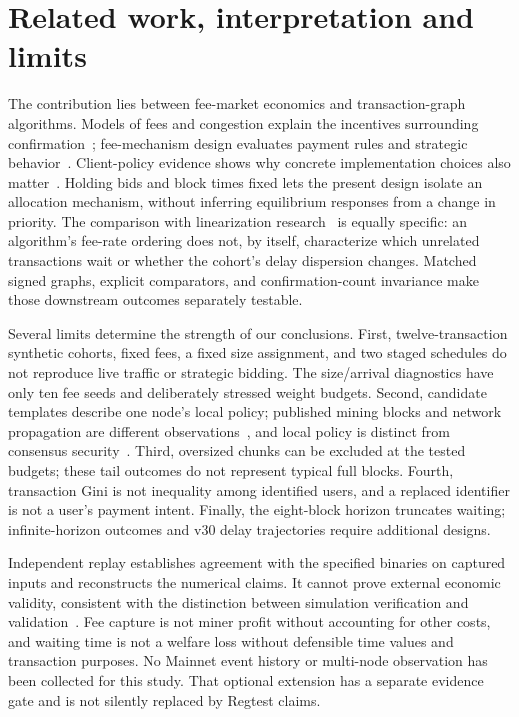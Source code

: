 \documentclass[conference]{IEEEtran}
\begin{document}


\section{Related work, interpretation and limits}
The contribution lies between fee-market economics and transaction-graph algorithms. Models of fees and congestion explain the incentives surrounding confirmation~\cite{easley2019,huberman2021,kamada2025}; fee-mechanism design evaluates payment rules and strategic behavior~\cite{roughgarden2024,stablefees2023}. Client-policy evidence shows why concrete implementation choices also matter~\cite{moser2015}. Holding bids and block times fixed lets the present design isolate an allocation mechanism, without inferring equilibrium responses from a change in priority. The comparison with linearization research~\cite{linearization2026} is equally specific: an algorithm's fee-rate ordering does not, by itself, characterize which unrelated transactions wait or whether the cohort's delay dispersion changes. Matched signed graphs, explicit comparators, and confirmation-count invariance make those downstream outcomes separately testable.

Several limits determine the strength of our conclusions. First, twelve-transaction synthetic cohorts, fixed fees, a fixed size assignment, and two staged schedules do not reproduce live traffic or strategic bidding. The size/arrival diagnostics have only ten fee seeds and deliberately stressed weight budgets. Second, candidate templates describe one node's local policy; published mining blocks and network propagation are different observations~\cite{decker2013,gervais2016}, and local policy is distinct from consensus security~\cite{bonneau2015}. Third, oversized chunks can be excluded at the tested budgets; these tail outcomes do not represent typical full blocks. Fourth, transaction Gini is not inequality among identified users, and a replaced identifier is not a user's payment intent. Finally, the eight-block horizon truncates waiting; infinite-horizon outcomes and v30 delay trajectories require additional designs.

Independent replay establishes agreement with the specified binaries on captured inputs and reconstructs the numerical claims. It cannot prove external economic validity, consistent with the distinction between simulation verification and validation~\cite{sargent2013}. Fee capture is not miner profit without accounting for other costs, and waiting time is not a welfare loss without defensible time values and transaction purposes. No Mainnet event history or multi-node observation has been collected for this study. That optional extension has a separate evidence gate and is not silently replaced by Regtest claims.
\end{document}
